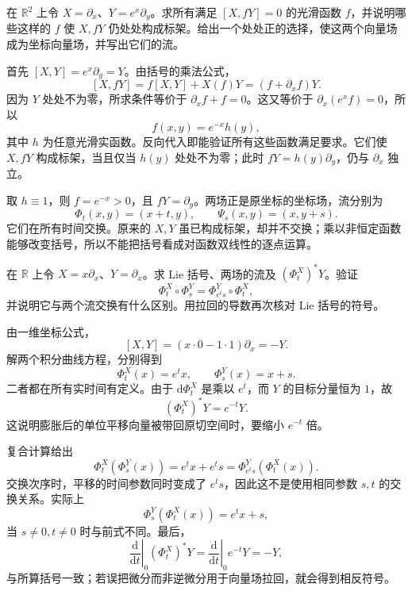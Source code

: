 \begin{exercise}
	\label{g1:exr:1303-rescaling-frame}
	在 \(\mathbb R^2\) 上令 \(X=\partial_x\)、\(Y=e^x\partial_y\)。求所有满足 \([X,fY]=0\) 的光滑函数 \(f\)，并说明哪些这样的 \(f\) 使 \(X,fY\) 仍处处构成标架。给出一个处处正的选择，使这两个向量场成为坐标向量场，并写出它们的流。
\end{exercise}
\begin{solution}
	首先 \([X,Y]=e^x\partial_y=Y\)。由括号的乘法公式，
	\[
		[X,fY]=f[X,Y]+X(f)Y=(f+\partial_xf)Y.
	\]
	因为 \(Y\) 处处不为零，所求条件等价于 \(\partial_xf+f=0\)。这又等价于 \(\partial_x(e^xf)=0\)，所以
	\[
		f(x,y)=e^{-x}h(y),
	\]
	其中 \(h\) 为任意光滑实函数。反向代入即能验证所有这些函数满足要求。它们使 \(X,fY\) 构成标架，当且仅当 \(h(y)\) 处处不为零；此时 \(fY=h(y)\partial_y\)，仍与 \(\partial_x\) 独立。

	取 \(h\equiv1\)，则 \(f=e^{-x}>0\)，且 \(fY=\partial_y\)。两场正是原坐标的坐标场，流分别为
	\[
		\Phi_t(x,y)=(x+t,y),\qquad \Psi_s(x,y)=(x,y+s).
	\]
	它们在所有时间交换。原来的 \(X,Y\) 虽已构成标架，却并不交换；乘以非恒定函数能够改变括号，所以不能把括号看成对函数双线性的逐点运算。
\end{solution}

\begin{exercise}
	\label{g1:exr:1303-affine-flows}
	在 \(\mathbb R\) 上令 \(X=x\partial_x\)、\(Y=\partial_x\)。求 Lie 括号、两场的流及 \((\Phi_t^X)^*Y\)。验证
	\[
		\Phi_t^X\circ\Phi_s^Y=\Phi_{e^ts}^Y\circ\Phi_t^X,
	\]
	并说明它与两个流交换有什么区别。用拉回的导数再次核对 Lie 括号的符号。
\end{exercise}
\begin{solution}
	由一维坐标公式，
	\[
		[X,Y]=(x\cdot0-1\cdot1)\partial_x=-Y.
	\]
	解两个积分曲线方程，分别得到
	\[
		\Phi_t^X(x)=e^tx,\qquad \Phi_s^Y(x)=x+s.
	\]
	二者都在所有实时间有定义。由于 \(\mathrm{d}\Phi_t^X\) 是乘以 \(e^t\)，而 \(Y\) 的目标分量恒为 \(1\)，故
	\[
		(\Phi_t^X)^*Y=e^{-t}Y.
	\]
	这说明膨胀后的单位平移向量被带回原切空间时，要缩小 \(e^{-t}\) 倍。

	复合计算给出
	\[
		\Phi_t^X(\Phi_s^Y(x))=e^tx+e^ts
		=\Phi_{e^ts}^Y(\Phi_t^X(x)).
	\]
	交换次序时，平移的时间参数同时变成了 \(e^ts\)，因此这不是使用相同参数 \(s,t\) 的交换关系。实际上
	\[
		\Phi_s^Y(\Phi_t^X(x))=e^tx+s,
	\]
	当 \(s\ne0,t\ne0\) 时与前式不同。最后，
	\[
		\left.\frac{\mathrm{d}}{\mathrm{d}t}\right|_0(\Phi_t^X)^*Y
		=\left.\frac{\mathrm{d}}{\mathrm{d}t}\right|_0e^{-t}Y=-Y,
	\]
	与所算括号一致；若误把微分而非逆微分用于向量场拉回，就会得到相反符号。
\end{solution}


